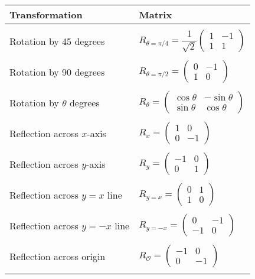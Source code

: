 \begin{table}[H]
\begin{center}
\begin{tabular}{l|l}
Transformation & Matrix \\ \hline\hline \\[-7pt]
Rotation by 45 degrees & $R_{\theta=\pi/4} = \dfrac{1}{\sqrt{2}}\begin{pmatrix} 1 & -1 \\ 1 & 1 \end{pmatrix}$ \\[10pt] \hline  \\[-7pt]
Rotation by 90 degrees & $R_{\theta=\pi/2} = \begin{pmatrix} 0 & -1 \\ 1 & 0 \end{pmatrix}$ \\[10pt] \hline \\[-7pt]
Rotation by $\theta$ degrees & $R_{\theta} = \begin{pmatrix} \cos\theta & -\sin\theta \\ \sin\theta & \cos\theta \end{pmatrix}$ \\[10pt] \hline \\[-7pt]
Reflection across $x$-axis & $R_{x} = \begin{pmatrix} 1 & 0 \\ 0 & -1 \end{pmatrix}$ \\ [10pt] \hline \\[-7pt]
Reflection across $y$-axis & $R_{y} = \begin{pmatrix} -1 & 0 \\ 0 & 1 \end{pmatrix}$ \\ [10pt] \hline \\[-7pt]
Reflection across $y=x$ line & $R_{y=x} = \begin{pmatrix} 0 & 1 \\ 1 & 0 \end{pmatrix}$ \\ [10pt] \hline \\[-7pt]
Reflection across $y=-x$ line & $R_{y=-x} = \begin{pmatrix} 0 & -1 \\ -1 & 0 \end{pmatrix}$ \\[10pt] \hline \\[-7pt]
Reflection across origin & $R_{\mathcal{O}} = \begin{pmatrix} -1 & 0 \\ 0 & -1 \end{pmatrix}$ \\[10pt] \hline \\[-7pt]

\end{tabular}
\end{center}
\end{table}
